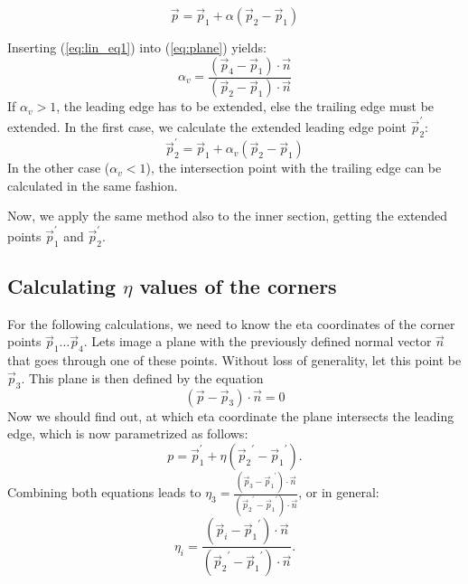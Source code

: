\begin{equation}
\vec p = \vec p_1 + \alpha (\vec p_2 - \vec p_1)
\label{eq:lin_eq1}
\end{equation}

Inserting (\ref{eq:lin_eq1}) into (\ref{eq:plane}) yields:
\begin{equation}
\alpha_v = \frac {(\vec p_4 - \vec p_1) \cdot \vec n }{(\vec p_2 - \vec p_1) \cdot \vec n}
\label{eq:nothing}
\end{equation}
%
If $\alpha_v > 1$, the leading edge has to be extended, else the trailing edge must be extended. In the first case, we calculate the extended leading edge point $\vec p_2^\prime$:
\begin{equation}
\vec p_2^\prime = \vec p_1 + \alpha_v (\vec p_2 - \vec p_1)
\label{eq:}
\end{equation}
%
In the other case ($\alpha_v < 1$), the intersection point with the trailing edge can be calculated in the same fashion.  \par
Now, we apply the same method also to the inner section, getting the extended points $\vec p_1^\prime$ and $\vec p_2^\prime$.

\subsection{Calculating $\eta$ values of the corners}
For the following calculations, we need to know the eta coordinates of the corner points $\vec p_1 \dots \vec p_4$. Lets image a plane with the previously defined normal vector $\vec n$ that goes through one of these points. Without loss of generality, let this point be $\vec p_3$. This plane is then defined by the equation
%
\begin{equation}
(\vec p - \vec p_3) \cdot \vec n = 0
\label{eq:plane_p3}
\end{equation}
%
Now we should find out, at which eta coordinate the plane intersects the leading edge, which is now parametrized as follows:
\begin{equation}
p = \vec p_1^ \prime + \eta ({\vec p_2}^\prime - {\vec p_1}^\prime).
\end{equation}
Combining both equations leads to $\eta_3 = \frac {(\vec p_3 - {\vec p_1}^\prime) \cdot \vec n }{({\vec p_2}^\prime - {\vec p_1}^\prime) \cdot \vec n}$, or in general:
\begin{equation}
\eta_i = \frac {(\vec p_i - {\vec p_1}^\prime) \cdot \vec n }{({\vec p_2}^\prime - {\vec p_1}^\prime)\cdot \vec n}.
\end{equation}

